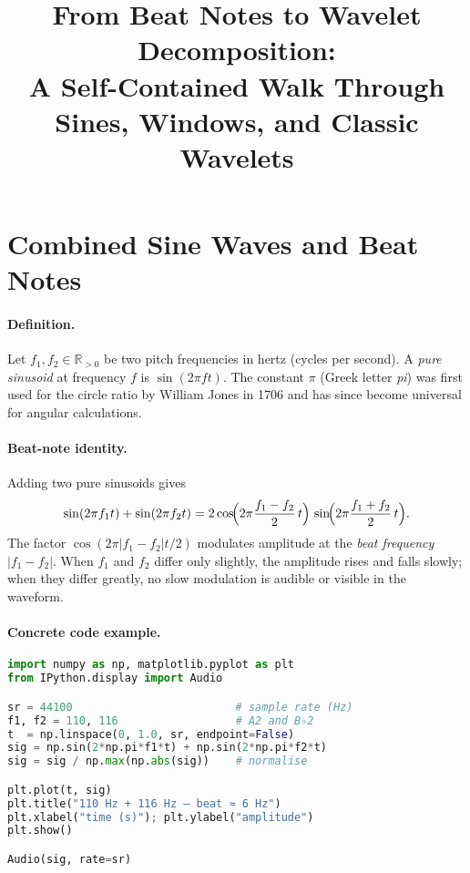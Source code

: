 \documentclass[11pt]{article}
\title{From Beat Notes to Wavelet Decomposition:\\
A Self-Contained Walk Through Sines, Windows, and Classic Wavelets}
\author{}
\date{}
\begin{document}
\maketitle

\tableofcontents
\bigskip

\section{Combined Sine Waves and Beat Notes}

\paragraph{Definition.}
Let \(f_1, f_2 \in \mathbb{R}_{>0}\) be two pitch frequencies in hertz (cycles per second).
A \emph{pure sinusoid} at frequency \(f\) is \( \sin(2\pi f t) \).
The constant \( \pi \) (Greek letter \emph{pi}) was first used for the circle ratio by
William Jones in 1706 and has since become universal for angular calculations.

\paragraph{Beat-note identity.}
Adding two pure sinusoids gives
\[
\sin(2\pi f_1 t) + \sin(2\pi f_2 t)
     = 2 \cos\!\Bigl(2\pi \frac{f_1 - f_2}{2}\, t\Bigr)\,
       \sin\!\Bigl(2\pi \frac{f_1 + f_2}{2}\, t\Bigr).
\]
The factor \( \cos(2\pi |f_1-f_2|t/2) \) modulates amplitude at the
\emph{beat frequency} \( |f_1 - f_2| \).  When \( f_1 \) and \( f_2 \) differ only
slightly, the amplitude rises and falls slowly; when they differ greatly,
no slow modulation is audible or visible in the waveform.

\paragraph{Concrete code example.}
\begin{lstlisting}[language=Python,caption={One-second beat note at 110 Hz and 116 Hz}]
import numpy as np, matplotlib.pyplot as plt
from IPython.display import Audio

sr = 44100                         # sample rate (Hz)
f1, f2 = 110, 116                  # A2 and B♭2
t  = np.linspace(0, 1.0, sr, endpoint=False)
sig = np.sin(2*np.pi*f1*t) + np.sin(2*np.pi*f2*t)
sig = sig / np.max(np.abs(sig))    # normalise

plt.plot(t, sig)
plt.title("110 Hz + 116 Hz — beat ≈ 6 Hz")
plt.xlabel("time (s)"); plt.ylabel("amplitude")
plt.show()

Audio(sig, rate=sr)
\end{lstlisting}
\end{document}
